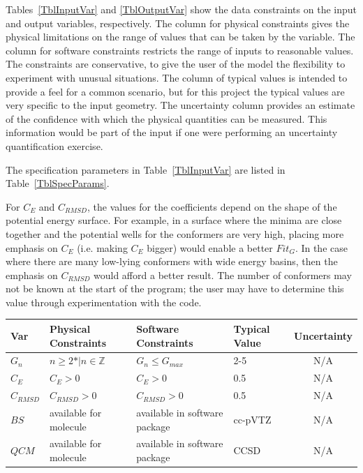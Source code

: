 \documentclass[12pt]{article}
\begin{document}
Tables~\ref{TblInputVar} and \ref{TblOutputVar} show the data constraints on the
input and output variables, respectively.  The column for physical constraints gives
the physical limitations on the range of values that can be taken by the
variable.  The column for software constraints restricts the range of inputs to
reasonable values.  The constraints are conservative, to give the user of the
model the flexibility to experiment with unusual situations.  The column of
typical values is intended to provide a feel for a common scenario, but for 
this project the typical values are very specific to the input geometry.  The
uncertainty column provides an estimate of the confidence with which the
physical quantities can be measured.  This information would be part of the
input if one were performing an uncertainty quantification exercise.

The specification parameters in Table~\ref{TblInputVar} are listed in
Table~\ref{TblSpecParams}.


For $C_E$ and $C_{RMSD}$, the values for the coefficients depend on the shape 
of the potential energy surface. For example, in a surface where the minima are 
close together and the potential wells for the conformers are very high, 
placing more emphasis on $C_E$ (i.e. making $C_E$ bigger) would enable a better 
$Fit_G$. In the case where there are many low-lying conformers with wide energy 
basins, then the emphasis on $C_{RMSD}$ would afford a better result. The 
number of conformers may not be known at the start of the program; the user may 
have to determine this value through experimentation with the code.

\begin{table}[!h]
  \caption{Input Variables} \label{TblInputVar}
  \renewcommand{\arraystretch}{1.2}
\noindent \begin{longtable*}{l l l l c} 
  \toprule
  \textbf{Var} & \textbf{Physical Constraints} & \textbf{Software Constraints} &
                             \textbf{Typical Value} & \textbf{Uncertainty}\\
  \midrule 
  $G_n$ & $n\geq 2\text{*} | n\in{\mathbb{Z}}$ & $G_n \leq G_{max}$ & 2-5 & N/A 
  \\
  $C_E$ & $C_E > 0$ & $C_E > 0$ & 0.5 & N/A \\
  $C_{RMSD}$ & $C_{RMSD} > 0$ & $C_{RMSD} > 0$ & 0.5 & N/A \\
  $BS$ & available for molecule & available in software package & cc-pVTZ & N/A 
  \\
  $QCM$& available for molecule & available in software package & CCSD & N/A \\
  \bottomrule
\end{longtable*}
\end{table}
\end{document}
